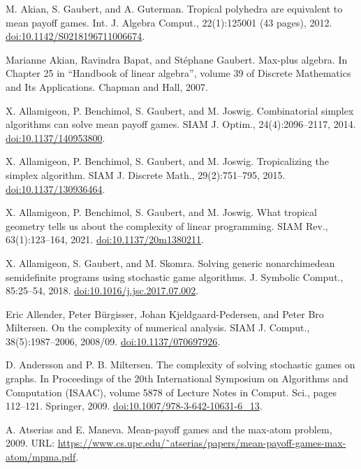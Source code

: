  M. Akian, S. Gaubert, and A. Guterman. Tropical polyhedra are equivalent to mean payoff games. Int. J. Algebra Comput., 22(1):125001 (43 pages), 2012. \href{https://doi.org/10.1142/S0218196711006674}{doi:10.1142/S0218196711006674}.

 Marianne Akian, Ravindra Bapat, and Stéphane Gaubert. Max-plus algebra. In Chapter 25 in “Handbook of linear algebra”, volume 39 of Discrete Mathematics and Its Applications. Chapman and Hall, 2007.

 X. Allamigeon, P. Benchimol, S. Gaubert, and M. Joswig. Combinatorial simplex algorithms can solve mean payoff games. SIAM J. Optim., 24(4):2096–2117, 2014. \href{https://doi.org/10.1137/140953800}{doi:10.1137/140953800}.

 X. Allamigeon, P. Benchimol, S. Gaubert, and M. Joswig. Tropicalizing the simplex algorithm. SIAM J. Discrete Math., 29(2):751–795, 2015. \href{https://doi.org/10.1137/130936464}{doi:10.1137/130936464}.

 X. Allamigeon, P. Benchimol, S. Gaubert, and M. Joswig. What tropical geometry tells us about the complexity of linear programming. SIAM Rev., 63(1):123–164, 2021. \href{https://doi.org/10.1137/20m1380211}{doi:10.1137/20m1380211}.

 X. Allamigeon, S. Gaubert, and M. Skomra. Solving generic nonarchimedean semidefinite programs using stochastic game algorithms. J. Symbolic Comput., 85:25–54, 2018. \href{https://doi.org/10.1016/j.jsc.2017.07.002}{doi:10.1016/j.jsc.2017.07.002}.

 Eric Allender, Peter Bürgisser, Johan Kjeldgaard-Pedersen, and Peter Bro Miltersen. On the complexity of numerical analysis. SIAM J. Comput., 38(5):1987–2006, 2008/09. \href{https://doi.org/10.1137/070697926}{doi:10.1137/070697926}.

 D. Andersson and P. B. Miltersen. The complexity of solving stochastic games on graphs. In Proceedings of the 20th International Symposium on Algorithms and Computation (ISAAC), volume 5878 of Lecture Notes in Comput. Sci., pages 112–121. Springer, 2009. \href{https://doi.org/10.1007/978-3-642-10631-6_13}{doi:10.1007/978-3-642-10631-6\_13}.

 A. Atserias and E. Maneva. Mean-payoff games and the max-atom problem, 2009. URL: \href{https://www.cs.upc.edu/~atserias/papers/mean-payoff-games-max-atom/mpma.pdf}{https://www.cs.upc.edu/˜atserias/papers/mean-payoff-games-max-atom/mpma.pdf}.


